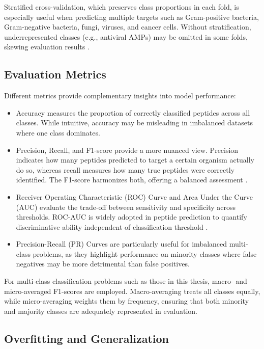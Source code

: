 \documentclass[a4paper,twoside,12pt]{book}
\begin{document}
Stratified cross-validation, which preserves class proportions in each fold, is especially useful when predicting multiple targets such as Gram-positive bacteria, Gram-negative bacteria, fungi, viruses, and cancer cells. Without stratification, underrepresented classes (e.g., antiviral AMPs) may be omitted in some folds, skewing evaluation results \cite{bib:xu2021}.

\subsection{Evaluation Metrics}

Different metrics provide complementary insights into model performance:

\begin{itemize}
    \item Accuracy measures the proportion of correctly classified peptides across all classes. While intuitive, accuracy may be misleading in imbalanced datasets where one class dominates.

    \item Precision, Recall, and F1-score provide a more nuanced view. Precision indicates how many peptides predicted to target a certain organism actually do so, whereas recall measures how many true peptides were correctly identified. The F1-score harmonizes both, offering a balanced assessment \cite{bib:saito2015}.

    \item Receiver Operating Characteristic (ROC) Curve and Area Under the Curve (AUC) evaluate the trade-off between sensitivity and specificity across thresholds. ROC-AUC is widely adopted in peptide prediction to quantify discriminative ability independent of classification threshold \cite{bib:wang2016_prediction}.

    \item Precision-Recall (PR) Curves are particularly useful for imbalanced multi-class problems, as they highlight performance on minority classes where false negatives may be more detrimental than false positives.
\end{itemize}


For multi-class classification problems such as those in this thesis, macro- and micro-averaged F1-scores are employed. Macro-averaging treats all classes equally, while micro-averaging weights them by frequency, ensuring that both minority and majority classes are adequately represented in evaluation.

\subsection{Overfitting and Generalization}
\end{document}
